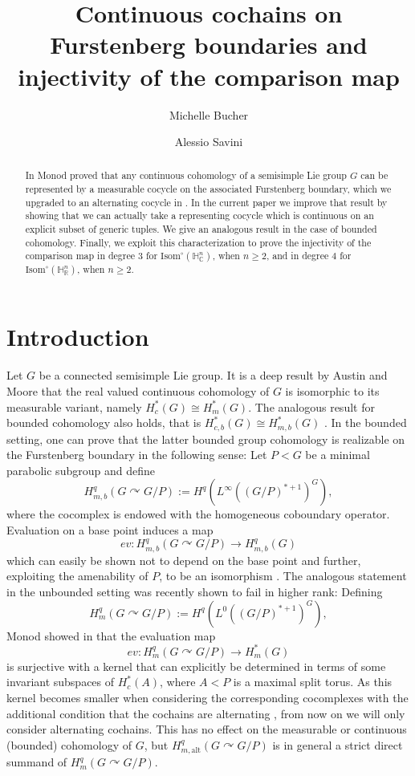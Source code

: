 \documentclass[a4paper]{amsart}
\title[Continuous cochains on Furstenberg boundaries]{Continuous cochains on Furstenberg boundaries and injectivity of the comparison map}
\author[Michelle Bucher]{%
Michelle Bucher}
\author[Alessio Savini]{%
Alessio Savini}
\theoremstyle{definition}
\theoremstyle{remark}
\theoremstyle{TheoremNum}
\begin{document}
\begin{abstract}
 In \cite{Monod} Monod proved that any continuous cohomology of a semisimple Lie group $G$ can be represented by a measurable  cocycle on the associated Furstenberg boundary, which we upgraded to an alternating  cocycle in \cite{BucSavAlt}. In the current paper we improve that result by showing that we can actually take a representing cocycle which is continuous on an explicit subset of generic tuples. We give an analogous result in the case of bounded cohomology. Finally, we exploit this characterization to prove the injectivity of the comparison map in degree $3$ for $\mathrm{Isom}^\circ(\mathbb{H}_{\mathbb{C}}^n)$, when $n \geq 2$, and in degree $4$ for $\mathrm{Isom}^\circ(\mathbb{H}^n_{\mathbb{R}})$, when $n \geq 2$. 
\end{abstract}

\maketitle
\section{Introduction}

Let $G$ be a connected semisimple Lie group. It is a deep result by Austin and Moore  \cite[Theorem A]{AM} that the real valued continuous cohomology of $G$ is isomorphic to its measurable variant, namely $H^*_c(G) \cong H^*_m(G)$. The analogous result for bounded cohomology also holds, that is $H^*_{c,b}(G) \cong H^*_{m,b}(G)$ \cite[Proposition 7.5.1]{Monodbook}. In the bounded setting, one can prove that the latter bounded group cohomology is realizable on the Furstenberg boundary in the following sense: Let $P<G$ be a minimal parabolic subgroup and define
$$H^q_{m,b}(G \curvearrowright G/P):=H^q(L^\infty((G/P)^{*+1})^G),$$
where the cocomplex is endowed with the homogeneous coboundary operator. Evaluation on a base point induces a map
$$ev:H^q_{m,b}(G \curvearrowright G/P)\longrightarrow H^q_{m,b}(G)$$
which can easily be shown not to depend on the base point and further, exploiting the amenability of $P$, to be an isomorphism \cite[Corollary 7.5.9]{Monodbook}.  The analogous statement in the unbounded setting was recently shown to fail in higher rank: Defining 
$$H^q_{m}(G \curvearrowright G/P):=H^q(L^0((G/P)^{*+1})^G),$$
Monod showed in \cite{Monod} that the evaluation  map
$$ev:H^q_{m}(G \curvearrowright G/P)\longrightarrow H^*_{m}(G)$$
is surjective with a kernel that can explicitly be determined in terms of some invariant subspaces of $H^*_c(A)$, where $A<P$ is a maximal split torus. As this kernel becomes smaller when considering the corresponding cocomplexes with the additional condition that the cochains are alternating \cite{BucSavAlt}, from now on we will only consider alternating cochains. This has no effect on the measurable or continuous (bounded) cohomology of $G$, but $H^q_{m,\mathrm{alt}}(G \curvearrowright G/P)$ is in general a strict direct summand of $H^q_{m}(G \curvearrowright G/P)$.
\end{document}
